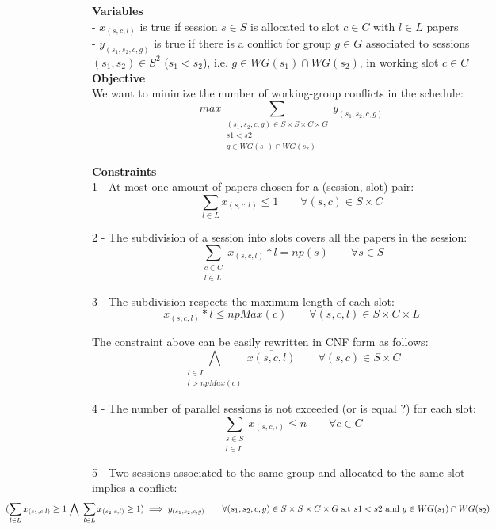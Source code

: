 \documentclass{article}
\begin{document}
\textbf{Variables}\\

- $x_{(s,c,l)} $ is true if session $s\in S$ is allocated to slot $c\in C$ with $l\in L$ papers \\


- $y_{(s_1,s_2,c,g)}$ is true if there is a conflict for group $g\in G$ associated to sessions $(s_1,s_2)\in S^2$ ($s_1<s_2$), i.e. $g\in WG(s_1)\cap WG(s_2)$, in working slot $c\in C$\\


\textbf{Objective}\\
We want to minimize the number of working-group conflicts in the schedule:
$$max \sum_{\substack{(s_1,s_2,c,g)\in S\times S\times C\times G \\ s1<s2 \\ g\in WG(s_1)\cap WG(s_2)}} \overline{y_{(s_1,s_2,c,g)}}$$


\textbf{Constraints}\\

1 - At most one amount of papers chosen for a (session, slot) pair:
$$\sum_{l\in L} x_{(s,c,l)}\leq 1 \qquad \forall (s,c)\in S\times C$$ 

2 - The subdivision of a session into slots covers all the papers in the session:
$$ \sum_{\substack{c\in C\\ l\in L}} x_{(s,c,l)}*l  = np(s)   \qquad \forall s\in S$$

3 - The subdivision respects the maximum length of each slot:
$$ x_{(s,c,l)}*l \leq npMax(c)\qquad \forall (s,c,l)\in S\times C\times L$$ 

The constraint above can be easily rewritten in CNF form as follows:
$$\bigwedge_{\substack{l\in L\\ l>npMax(c)}}\overline{x(s,c,l)} \qquad \forall (s,c)\in S\times C$$ 

4 - The number of parallel sessions is not exceeded (or is equal ?) for each slot:
$$\sum_{\substack{s\in S\\ l\in L}} x_{(s,c,l)} \leq n \qquad \forall c \in C$$ 

5 - Two sessions associated to the same group and allocated to the same slot implies a conflict:
$$\hspace*{-3.5cm} (\sum_{l\in L} x_{(s_1,c,l)} \geq 1 \,\bigwedge\; \sum_{l\in L} x_{(s_2,c,l)}\geq 1) \implies y_{(s_1,s_2,c,g)} \qquad \forall (s_1,s_2,c,g)\in S\times S\times C\times G\text{ s.t } s1<s2\text{ and } g\in WG(s_1)\cap WG(s_2)$$    
\end{document}
